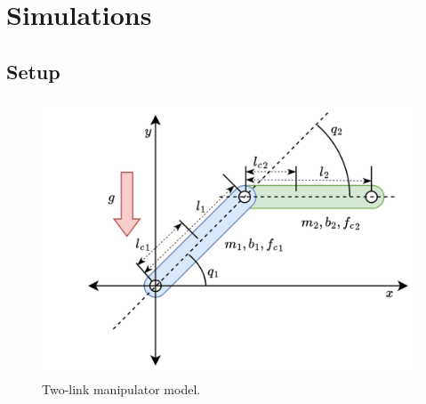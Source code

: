\documentclass[letterpaper, 10 pt, conference]{ieeeconf}  %
\begin{document}


\section{Simulations}\label{sec:sim}

\subsection{Setup}

\begin{figure}[!t]
    \centering
    \includegraphics[width=0.8\linewidth]{fig/RobotModel.drawio.png}
    \caption{Two-link manipulator model.}
    \label{fig: manipulator}
\end{figure}
\end{document}
